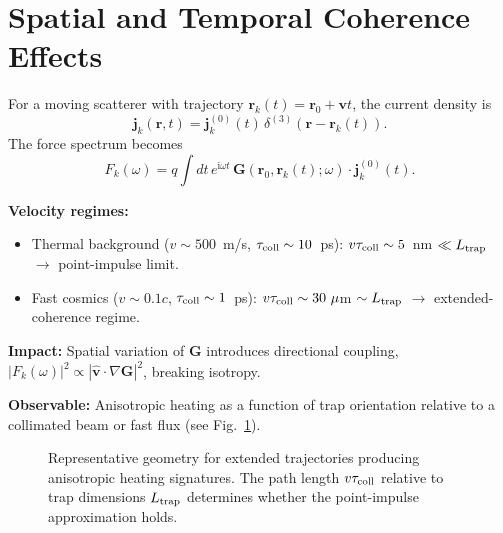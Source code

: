 \section{Spatial and Temporal Coherence Effects}
\label{sec:spatial-coherence}
\begin{tcolorbox}[title=Fast scatterers: spatial coherence effects]
For a moving scatterer with trajectory $\mathbf{r}_k(t)=\mathbf{r}_0+\mathbf{v}t$, the current density is
\[
\mathbf{j}_k(\mathbf{r},t) = \mathbf{j}^{(0)}_k(t)\,\delta^{(3)}(\mathbf{r}-\mathbf{r}_k(t)).
\]
The force spectrum becomes
\[
F_k(\omega) = q \int dt\, e^{\mathrm{i}\omega t}\,\mathbf{G}(\mathbf{r}_0,\mathbf{r}_k(t);\omega)\cdot\mathbf{j}^{(0)}_k(t).
\]

\textbf{Velocity regimes:}
\begin{itemize}\itemsep0.2em
  \item Thermal background ($v \sim 500$~m/s, $\tau_{\rm coll}\sim 10$~ps): $v\tau_{\rm coll}\sim 5$~nm $\ll L_{\rm trap}$ $\to$ point-impulse limit.
  \item Fast cosmics ($v\sim 0.1c$, $\tau_{\rm coll}\sim 1$~ps): $v\tau_{\rm coll}\sim 30~\mu$m $\sim L_{\rm trap}$ $\to$ extended-coherence regime.
\end{itemize}

\textbf{Impact:} Spatial variation of $\mathbf{G}$ introduces directional coupling, $|F_k(\omega)|^2 \propto |\hat{\mathbf{v}}\cdot\nabla\mathbf{G}|^2$, breaking isotropy.

\textbf{Observable:} Anisotropic heating as a function of trap orientation relative to a collimated beam or fast flux (see Fig.~\ref{fig:trajectory_coherence}).
\end{tcolorbox}

\begin{figure}[t]
  \centering
  
  \caption{Representative geometry for extended trajectories producing anisotropic heating signatures.
  The path length $v\tau_{\rm coll}$ relative to trap dimensions $L_{\rm trap}$ determines whether the point-impulse approximation holds.}
  \label{fig:trajectory_coherence}
\end{figure}

